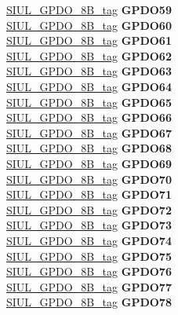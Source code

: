 \begin{DoxyCompactItemize}
\begin{tabbing}
\>\>\mbox{\hyperlink{unionSIUL__GPDO__8B__tag}{SIUL\_GPDO\_8B\_tag}} {\bfseries GPDO59}\\
\>\>\mbox{\hyperlink{unionSIUL__GPDO__8B__tag}{SIUL\_GPDO\_8B\_tag}} {\bfseries GPDO60}\\
\>\>\mbox{\hyperlink{unionSIUL__GPDO__8B__tag}{SIUL\_GPDO\_8B\_tag}} {\bfseries GPDO61}\\
\>\>\mbox{\hyperlink{unionSIUL__GPDO__8B__tag}{SIUL\_GPDO\_8B\_tag}} {\bfseries GPDO62}\\
\>\>\mbox{\hyperlink{unionSIUL__GPDO__8B__tag}{SIUL\_GPDO\_8B\_tag}} {\bfseries GPDO63}\\
\>\>\mbox{\hyperlink{unionSIUL__GPDO__8B__tag}{SIUL\_GPDO\_8B\_tag}} {\bfseries GPDO64}\\
\>\>\mbox{\hyperlink{unionSIUL__GPDO__8B__tag}{SIUL\_GPDO\_8B\_tag}} {\bfseries GPDO65}\\
\>\>\mbox{\hyperlink{unionSIUL__GPDO__8B__tag}{SIUL\_GPDO\_8B\_tag}} {\bfseries GPDO66}\\
\>\>\mbox{\hyperlink{unionSIUL__GPDO__8B__tag}{SIUL\_GPDO\_8B\_tag}} {\bfseries GPDO67}\\
\>\>\mbox{\hyperlink{unionSIUL__GPDO__8B__tag}{SIUL\_GPDO\_8B\_tag}} {\bfseries GPDO68}\\
\>\>\mbox{\hyperlink{unionSIUL__GPDO__8B__tag}{SIUL\_GPDO\_8B\_tag}} {\bfseries GPDO69}\\
\>\>\mbox{\hyperlink{unionSIUL__GPDO__8B__tag}{SIUL\_GPDO\_8B\_tag}} {\bfseries GPDO70}\\
\>\>\mbox{\hyperlink{unionSIUL__GPDO__8B__tag}{SIUL\_GPDO\_8B\_tag}} {\bfseries GPDO71}\\
\>\>\mbox{\hyperlink{unionSIUL__GPDO__8B__tag}{SIUL\_GPDO\_8B\_tag}} {\bfseries GPDO72}\\
\>\>\mbox{\hyperlink{unionSIUL__GPDO__8B__tag}{SIUL\_GPDO\_8B\_tag}} {\bfseries GPDO73}\\
\>\>\mbox{\hyperlink{unionSIUL__GPDO__8B__tag}{SIUL\_GPDO\_8B\_tag}} {\bfseries GPDO74}\\
\>\>\mbox{\hyperlink{unionSIUL__GPDO__8B__tag}{SIUL\_GPDO\_8B\_tag}} {\bfseries GPDO75}\\
\>\>\mbox{\hyperlink{unionSIUL__GPDO__8B__tag}{SIUL\_GPDO\_8B\_tag}} {\bfseries GPDO76}\\
\>\>\mbox{\hyperlink{unionSIUL__GPDO__8B__tag}{SIUL\_GPDO\_8B\_tag}} {\bfseries GPDO77}\\
\>\>\mbox{\hyperlink{unionSIUL__GPDO__8B__tag}{SIUL\_GPDO\_8B\_tag}} {\bfseries GPDO78}\\

\end{tabbing}
\end{DoxyCompactItemize}
